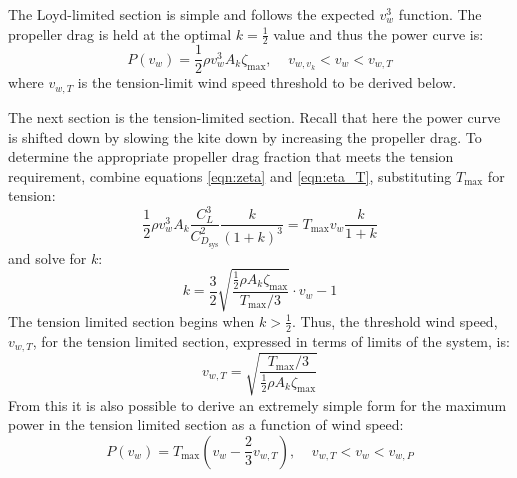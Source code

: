 \documentclass[11pt]{amsart}
\newcommand{\kite}{k}
\newcommand{\sys}{\mathrm{sys}}
\newcommand{\wind}{w}
\begin{document}
The Loyd-limited section is simple and follows the expected
$v_{\wind}^3$ function.  The propeller drag is held at the optimal
$k=\frac{1}{2}$ value and thus the power curve is:
%
\begin{equation}
P(v_{\wind}) = \frac{1}{2} \rho v_{\wind}^3 A_{\kite} \zeta_{\max},\;\;\;\;
v_{\wind,v_{\kite}} < v_{\wind} < v_{\wind,T}
\end{equation}
%
where $v_{\wind,T}$ is the tension-limit wind speed threshold to be
derived below.

The next section is the tension-limited section.  Recall that here the
power curve is shifted down by slowing the kite down by increasing the
propeller drag.  To determine the appropriate propeller drag fraction
that meets the tension requirement, combine equations \ref{eqn:zeta}
and \ref{eqn:eta_T}, substituting $T_{\max}$ for tension:
%
\begin{equation}
\frac{1}{2} \rho v_{\wind}^3 A_{\kite} \frac{C_L^3}{C_{D_{\sys}}^2} \frac{k}{(1 + k)^3}
= T_{\max} v_{\wind} \frac{k}{1 + k}
\end{equation}
%
and solve for $k$:
%
\begin{equation}
k = \frac{3}{2} \sqrt{\frac{\frac{1}{2} \rho A_{\kite} \zeta_{\max}}{T_{\max} / 3}} \cdot v_{\wind} - 1
\end{equation}
%
The tension limited section begins when $k > \frac{1}{2}$.  Thus, the
threshold wind speed, $v_{\wind,T}$, for the tension limited section,
expressed in terms of limits of the system, is:
%
\begin{equation}
v_{\wind,T} = \sqrt{\frac{T_{\max} / 3}{\frac{1}{2} \rho A_{\kite} \zeta_{\max}}}
\end{equation}
%
From this it is also possible to derive an extremely simple form for
the maximum power in the tension limited section as a function of wind
speed:
%
\begin{equation}
P(v_{\wind}) = T_{\max} \left( v_{\wind} - \frac{2}{3} v_{\wind,T} \right),\;\;\;\;
v_{\wind,T} < v_{\wind} < v_{\wind,P}
\end{equation}
\end{document}
